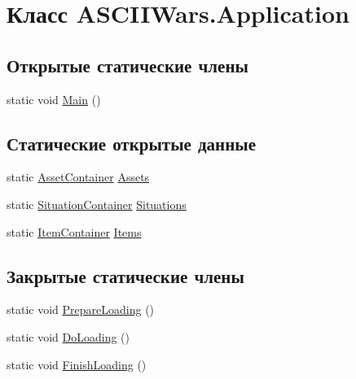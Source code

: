\hypertarget{class_a_s_c_i_i_wars_1_1_application}{}\section{Класс A\+S\+C\+I\+I\+Wars.\+Application}
\label{class_a_s_c_i_i_wars_1_1_application}
\subsection*{Открытые статические члены}
\begin{DoxyCompactItemize}
\item 
static void \hyperlink{class_a_s_c_i_i_wars_1_1_application_a12dbc4ab81c994876ce7bd2664eee54f}{Main} ()
\end{DoxyCompactItemize}
\subsection*{Статические открытые данные}
\begin{DoxyCompactItemize}
\item 
static \hyperlink{class_a_s_c_i_i_wars_1_1_game_1_1_asset_container}{Asset\+Container} \hyperlink{class_a_s_c_i_i_wars_1_1_application_a85f064f508e8f2448220b04da2ed903c}{Assets}
\item 
static \hyperlink{class_a_s_c_i_i_wars_1_1_game_1_1_situation_container}{Situation\+Container} \hyperlink{class_a_s_c_i_i_wars_1_1_application_ac5e91ee1a174bcb2d25ca9d40bf981b7}{Situations}
\item 
static \hyperlink{class_a_s_c_i_i_wars_1_1_game_1_1_item_container}{Item\+Container} \hyperlink{class_a_s_c_i_i_wars_1_1_application_a8ab343a894ec7b250b5e688d844894de}{Items}
\end{DoxyCompactItemize}
\subsection*{Закрытые статические члены}
\begin{DoxyCompactItemize}
\item 
static void \hyperlink{class_a_s_c_i_i_wars_1_1_application_a17ad0a44229caa1044d99f975ed97be3}{Prepare\+Loading} ()
\item 
static void \hyperlink{class_a_s_c_i_i_wars_1_1_application_a264d79af3a0048eef7ff8f864fdec698}{Do\+Loading} ()
\item 
static void \hyperlink{class_a_s_c_i_i_wars_1_1_application_a56252f7621e7b373696a7a79d09a052f}{Finish\+Loading} ()
\end{DoxyCompactItemize}


